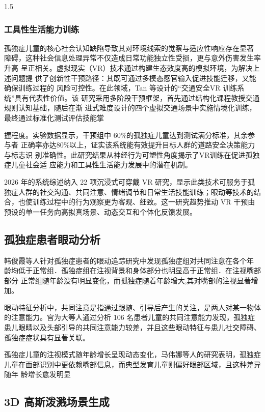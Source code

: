 \documentclass[zihao=-4]{ctexart}
\begin{document}
\begin{spacing}{1.5}
\subsubsection{工具性生活能力训练}

孤独症儿童的核心社会认知缺陷导致其对环境线索的觉察与适应性响应存在显著 障碍，这种社会信息处理异常不仅造成日常功能独立性受损，更与意外伤害发生率升高 呈正相关。虚拟现实（VR）技术通过构建生态效度高的模拟环境，为解决上述问题提 供了创新性干预路径：其既可通过多模态感官输入促进技能迁移，又能确保训练过程的 风险可控性。在此领域，Tan 等设计的“交通安全VR 训练系统”具有代表性价值。该 研究采用多阶段干预框架，首先通过结构化课程教授交通规则认知基础\cite{ref23}，随后在渐 进式难度设计的四个虚拟交通场景中实施情境化训练，最终通过标准化测试评估技能掌


握程度。实验数据显示，干预组中 60\%的孤独症儿童达到测试满分标准，其余参与者 正确率亦达80\%以上，证实该系统能有效提升目标人群的道路安全决策能力与标志识 别准确性。此研究结果从神经行为可塑性角度揭示了VR训练在促进孤独症儿童社会适 应能力和工具性生活能力发展中的潜在机制。

2026 年的系统综述纳入 22 项沉浸式可穿戴 VR 研究，显示此类技术可服务于孤独症人群的社交沟通、共同注意、情绪调节和日常生活技能训练；眼动等技术的结合，也使训练过程中的行为观察更为客观、细致\cite{ref16}。这一研究趋势推动 VR 干预由预设的单一任务向高拟真场景、动态交互和个体化反馈发展。

\subsection{孤独症患者眼动分析}

韩俊霞等人针对孤独症患者的眼动追踪研究中发现孤独症组对共同注意在各个年 龄均低于正常组．孤独症组在注视背景和身体部分也明显高于正常组．在注视嘴部部分 正常组随年龄没有明显变化，而孤独症随着年龄增大,其对嘴部的注视显著增加\cite{ref24}。

眼动特征分析中，共同注意是指通过跟随、引导后产生的关注，是两人对某一物体的注意能力。宫为大等人通过分析 106 名患者儿童的共同注意能力发现，孤独症患儿眼睛以及头部引导的共同注意能力较差，并且这些眼动特征与患儿社交障碍、孤独症症状具有显著关联\cite{ref25}。

孤独症儿童的注视模式随年龄增长呈现动态变化，马伟娜等人的研究表明，孤独症 儿童在面部识别中更依赖嘴部信息，而典型发育儿童则偏好眼部区域，且这种差异随年 龄增长愈发明显\cite{ref26}

\subsection{3D 高斯泼溅场景生成}


\end{spacing}
\end{document}
